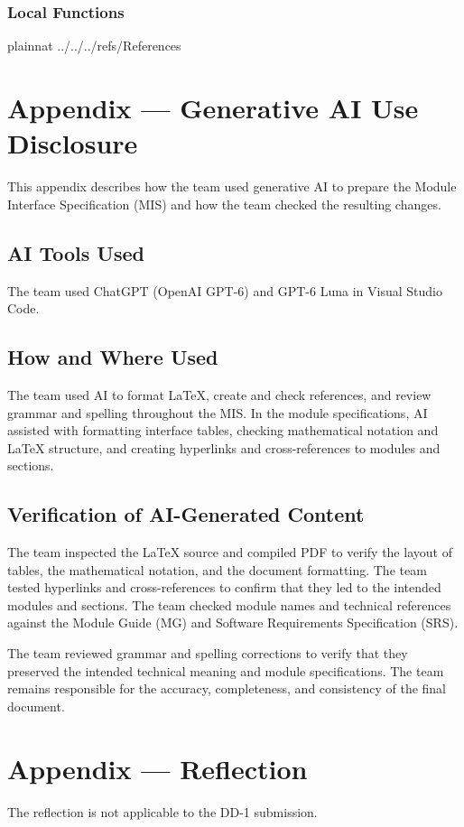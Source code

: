 \documentclass[12pt, titlepage]{article}
\begin{document}
\subsubsection{Local Functions}

\newpage

 {plainnat}
 {../../../refs/References}

\newpage

\newpage{}

\section{Appendix --- Generative AI Use Disclosure}

This appendix describes how the team used generative AI to prepare the Module
Interface Specification (MIS) and how the team checked the resulting changes.

\subsection{AI Tools Used}

The team used ChatGPT (OpenAI GPT-6) and GPT-6 Luna in Visual Studio Code.

\subsection{How and Where Used}

The team used AI to format \LaTeX{}, create and check references, and review
grammar and spelling throughout the MIS. In the module specifications, AI
assisted with formatting interface tables, checking mathematical notation
and \LaTeX{} structure, and creating hyperlinks and cross-references to
modules and sections.

\subsection{Verification of AI-Generated Content}

The team inspected the \LaTeX{} source and compiled PDF to verify the layout
of tables, the mathematical notation, and the document formatting. The team
tested hyperlinks and cross-references to confirm that they led to the
intended modules and sections. The team checked module names and technical
references against the Module Guide (MG) and Software Requirements
Specification (SRS).

The team reviewed grammar and spelling corrections to verify that they
preserved the intended technical meaning and module specifications. The team
remains responsible for the accuracy, completeness, and consistency of the
final document.

\newpage{}

\section{Appendix --- Reflection}

The reflection is not applicable to the DD-1 submission.
\end{document}
